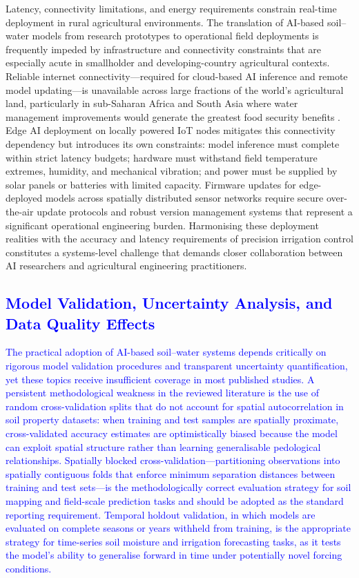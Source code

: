 \documentclass[land,article,submit,pdftex,moreauthors]{Definitions/mdpi}
\numberwithin{equation}{section}
\begin{document}
Latency, connectivity limitations, and energy requirements constrain real-time deployment in rural agricultural environments. The translation of AI-based soil--water models from research prototypes to operational field deployments is frequently impeded by infrastructure and connectivity constraints that are especially acute in smallholder and developing-country agricultural contexts. Reliable internet connectivity---required for cloud-based AI inference and remote model updating---is unavailable across large fractions of the world's agricultural land, particularly in sub-Saharan Africa and South Asia where water management improvements would generate the greatest food security benefits \citep{shepherd2022ethics}. Edge AI deployment on locally powered IoT nodes mitigates this connectivity dependency but introduces its own constraints: model inference must complete within strict latency budgets; hardware must withstand field temperature extremes, humidity, and mechanical vibration; and power must be supplied by solar panels or batteries with limited capacity. Firmware updates for edge-deployed models across spatially distributed sensor networks require secure over-the-air update protocols and robust version management systems that represent a significant operational engineering burden. Harmonising these deployment realities with the accuracy and latency requirements of precision irrigation control constitutes a systems-level challenge that demands closer collaboration between AI researchers and agricultural engineering practitioners.

\subsection{\textcolor{blue}{Model Validation, Uncertainty Analysis, and Data Quality Effects}}

\textcolor{blue}{The practical adoption of AI-based soil--water systems depends critically on rigorous model validation procedures and transparent uncertainty quantification, yet these topics receive insufficient coverage in most published studies. A persistent methodological weakness in the reviewed literature is the use of random cross-validation splits that do not account for spatial autocorrelation in soil property datasets: when training and test samples are spatially proximate, cross-validated accuracy estimates are optimistically biased because the model can exploit spatial structure rather than learning generalisable pedological relationships. Spatially blocked cross-validation---partitioning observations into spatially contiguous folds that enforce minimum separation distances between training and test sets---is the methodologically correct evaluation strategy for soil mapping and field-scale prediction tasks and should be adopted as the standard reporting requirement. Temporal holdout validation, in which models are evaluated on complete seasons or years withheld from training, is the appropriate strategy for time-series soil moisture and irrigation forecasting tasks, as it tests the model's ability to generalise forward in time under potentially novel forcing conditions.}
\end{document}
